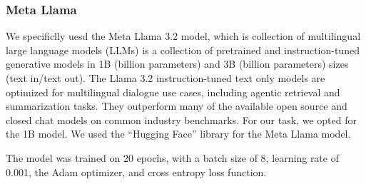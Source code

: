 \subsubsection{Meta Llama}
We specificlly uesd the Meta Llama 3.2 model, which is collection of multilingual large language models (LLMs) is a collection of pretrained and instruction-tuned generative models in 1B (billion parameters) and 3B (billion parameters) sizes (text in/text out). The Llama 3.2 instruction-tuned text only models are optimized for multilingual dialogue use cases, including agentic retrieval and summarization tasks. They outperform many of the available open source and closed chat models on common industry benchmarks. For our task, we opted for the 1B model. We used the ``Hugging Face'' library for the Meta Llama model. 

The model was trained on 20 epochs, with a batch size of 8, learning rate of 0.001, the Adam optimizer, and cross entropy loss function. 